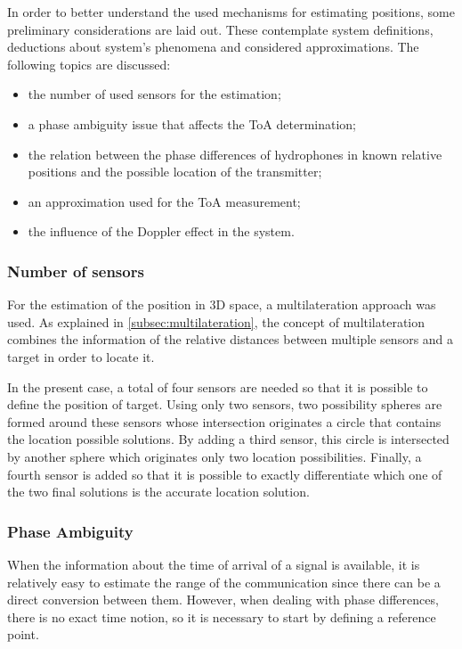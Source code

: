 In order to better understand the used mechanisms for estimating positions, some preliminary considerations are laid out. These contemplate system definitions, deductions about system's phenomena and considered approximations. The following topics are discussed: 

\begin{itemize}
	\item the number of used sensors for the estimation;
	\item a phase ambiguity issue that affects the ToA determination;
	\item the relation between the phase differences of hydrophones in known relative positions and the possible location of the transmitter;
	\item an approximation used for the ToA measurement;
	\item the influence of the Doppler effect in the system.
\end{itemize}

\subsubsection{Number of sensors}
For the estimation of the position in 3D space, a multilateration approach was used. As explained in \ref{subsec:multilateration}, the concept of multilateration combines the information of the relative distances between multiple sensors and a target in order to locate it. 

In the present case, a total of four sensors are needed so that it is possible to define the position of target. Using only two sensors, two possibility spheres are formed around these sensors whose intersection originates a circle that contains the location possible solutions. By adding a third sensor, this circle is intersected by another sphere which originates only two location possibilities. Finally, a fourth sensor is added so that it is possible to exactly differentiate which one of the two final solutions is the accurate location solution. 

\subsubsection{Phase Ambiguity}

When the information about the time of arrival of a signal is available, it is relatively easy to estimate the range of the communication since there can be a direct conversion between them. However, when dealing with phase differences, there is no exact time notion, so it is necessary to start by defining a reference point. 

